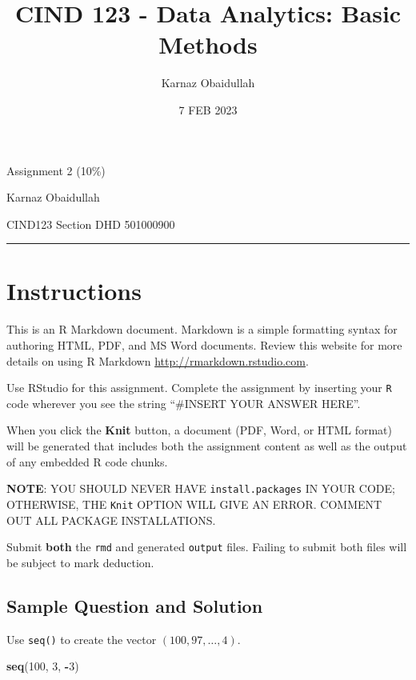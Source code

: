 \documentclass[
]{article}
\title{CIND 123 - Data Analytics: Basic Methods}
\author{Karnaz Obaidullah}
\date{7 FEB 2023}
\newenvironment{Shaded}{\begin{snugshade}}{\end{snugshade}}
\newcommand{\DecValTok}[1]{\textcolor[rgb]{0.00,0.00,0.81}{#1}}
\newcommand{\FunctionTok}[1]{\textcolor[rgb]{0.13,0.29,0.53}{\textbf{#1}}}
\newcommand{\NormalTok}[1]{#1}
\newcommand{\SpecialCharTok}[1]{\textcolor[rgb]{0.81,0.36,0.00}{\textbf{#1}}}
\begin{document}
\maketitle

Assignment 2 (10\%)

Karnaz Obaidullah

CIND123 Section DHD 501000900

\begin{center}\rule{0.5\linewidth}{0.5pt}\end{center}

\hypertarget{instructions}{%
\section{Instructions}\label{instructions}}

This is an R Markdown document. Markdown is a simple formatting syntax
for authoring HTML, PDF, and MS Word documents. Review this website for
more details on using R Markdown \url{http://rmarkdown.rstudio.com}.

Use RStudio for this assignment. Complete the assignment by inserting
your \texttt{R} code wherever you see the string ``\#INSERT YOUR ANSWER
HERE''.

When you click the \textbf{Knit} button, a document (PDF, Word, or HTML
format) will be generated that includes both the assignment content as
well as the output of any embedded R code chunks.

\textbf{NOTE}: YOU SHOULD NEVER HAVE \texttt{install.packages} IN YOUR
CODE; OTHERWISE, THE \texttt{Knit} OPTION WILL GIVE AN ERROR. COMMENT
OUT ALL PACKAGE INSTALLATIONS.

Submit \textbf{both} the \texttt{rmd} and generated \texttt{output}
files. Failing to submit both files will be subject to mark deduction.

\hypertarget{sample-question-and-solution}{%
\subsection{Sample Question and
Solution}\label{sample-question-and-solution}}

Use \texttt{seq()} to create the vector \((100, 97, \dots, 4)\).

\begin{Shaded}
\begin{Highlighting}[]
\FunctionTok{seq}\NormalTok{(}\DecValTok{100}\NormalTok{, }\DecValTok{3}\NormalTok{, }\SpecialCharTok{{-}}\DecValTok{3}\NormalTok{)}
\end{Highlighting}
\end{Shaded}
\end{document}
